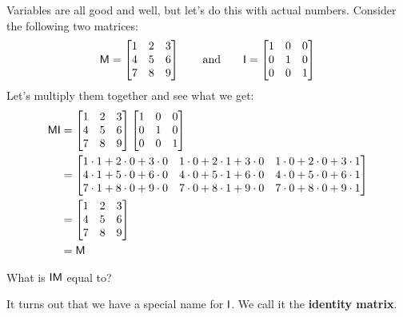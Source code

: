 Variables are all good and well, but let's do this with actual
numbers. Consider the following two matrices:
\[
\mathsf{M} =
\begin{bmatrix}
1 & 2 & 3\\
4 & 5 & 6\\
7 & 8 & 9
\end{bmatrix}
\qquad\text{and}\qquad
\mathsf{I} = 
\begin{bmatrix}
1 & 0 & 0\\
0 & 1 & 0\\
0 & 0 & 1
\end{bmatrix}
\]
Let's multiply them together and see what we get:
\begin{align*}
\mathsf{M}\mathsf{I} &= \begin{bmatrix}
1 & 2 & 3\\
4 & 5 & 6\\
7 & 8 & 9
\end{bmatrix}
\begin{bmatrix}
1 & 0 & 0\\
0 & 1 & 0\\
0 & 0 & 1
\end{bmatrix} \\
&=
\begin{bmatrix}
1\cdot 1 + 2\cdot 0 + 3\cdot 0 & 1\cdot 0 + 2\cdot 1 + 3\cdot 0 & 1\cdot 0 + 2\cdot 0 + 3\cdot 1\\
4\cdot 1 + 5\cdot 0 + 6\cdot 0 & 4\cdot 0 + 5\cdot 1 + 6\cdot 0 & 4\cdot 0 + 5\cdot 0 + 6\cdot 1\\
7\cdot 1 + 8\cdot 0 + 9\cdot 0 & 7\cdot 0 + 8\cdot 1 + 9\cdot 0 & 7\cdot 0 + 8\cdot 0 + 9\cdot 1 
\end{bmatrix} \\
&=
\begin{bmatrix}
1 & 2 & 3\\
4 & 5 & 6\\
7 & 8 & 9
\end{bmatrix} \\
&= \mathsf{M}
\end{align*}

\begin{question}
What is $\mathsf{I}\mathsf{M}$ equal to?
\end{question}
\QM 

It turns out that we have a special name for $\mathsf{I}$.  We call it the \textbf{identity matrix}.

